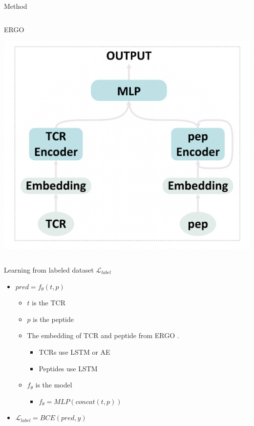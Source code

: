 \documentclass[aspectratio=1610,xcolor={dvipsnames},hyperref={colorlinks,unicode,linkcolor=violet,anchorcolor=blueviolet,citecolor=YellowOrange,filecolor=black,urlcolor=Aquamarine}]{beamer}
\begin{document}
\begin{frame}[label={sec:org47b6726}]{Method}
\begin{columns}
\begin{column}{0.4\columnwidth}
\begin{block}{ERGO}
\begin{center}
\includegraphics[width=.9\linewidth]{./p3.png}
\end{center}
\end{block}
\end{column}
\end{columns}
\end{frame}

\begin{frame}[label={sec:orgfbb2a02}]{Learning from labeled dataset \(\mathcal{L}_{label}\)}
\begin{itemize}
\item \(pred = f_{\theta}(t, p)\)
\begin{itemize}
\item \(t\) is the TCR
\item \(p\) is the peptide
\item The embedding of TCR and peptide from ERGO .
\begin{itemize}
\item TCRs use LSTM or AE
\item Peptides use LSTM
\end{itemize}
\item \(f_{\theta}\) is the model
\begin{itemize}
\item \(f_{\theta} = MLP(concat(t, p))\)
\end{itemize}
\end{itemize}
\item \(\mathcal{L}_{label} = BCE(pred, y)\)
\end{itemize}
\end{frame}
\end{document}
